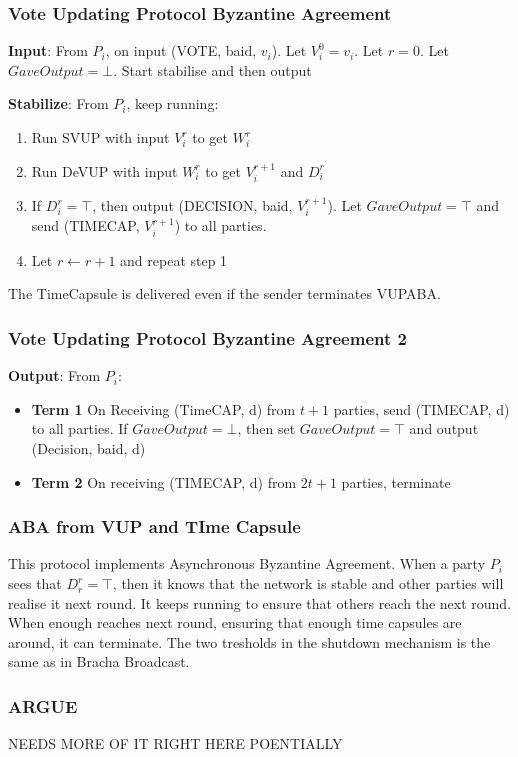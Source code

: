 \documentclass[14pt]{beamer}
\begin{document}
            \begin{frame}
                \frametitle{Vote Updating Protocol Byzantine Agreement}
                    \textbf{Input}: From $P_i$, on input (VOTE, baid, $v_i$). Let $V_{i}^0 = v_i$. Let $r = 0$. Let $GaveOutput = \bot$. Start stabilise and then output

                    \textbf{Stabilize}: From $P_i$, keep running:
                    \begin{enumerate}
                        \item Run SVUP with input $V_{i}^r$ to get $W_{i}^r$
                        \item Run DeVUP with input $W_{i}^r$ to get $V_{i}^{r+1}$ and $D_{i}^r$
                        \item If $D_{i}^r = \top$, then output (DECISION, baid, $V_{i}^{r+1}$). Let $GaveOutput = \top$ and send (TIMECAP, $V_{i}^{r+1}$) to all parties. 
                        \item Let $r \leftarrow r + 1$ and repeat step 1
                    \end{enumerate}
                    The TimeCapsule is delivered even if the sender terminates VUPABA. 
            \end{frame}
            \begin{frame}   
                \frametitle{Vote Updating Protocol Byzantine Agreement 2}
                    \textbf{Output}: From $P_i$:
                        \begin{itemize}
                            \item \textbf{Term 1} On Receiving (TimeCAP, d) from $t+1$ parties, send (TIMECAP, d) to all parties. If $GaveOutput = \bot$, then set $GaveOutput = \top$ and output (Decision, baid, d)
                            \item \textbf{Term 2} On receiving (TIMECAP, d) from $2t + 1$ parties, terminate
                        \end{itemize}
            \end{frame}

            \begin{frame}
                \frametitle{ABA from VUP and TIme Capsule}
                    This protocol implements Asynchronous Byzantine Agreement. When a party $P_i$ sees that $D_{r}^r = \top$, then it knows that the network is stable and other parties will realise it next round. It keeps running to ensure that others reach the next round. When enough reaches next round, ensuring that enough time capsules are around, it can terminate. The two tresholds in the shutdown mechanism is the same as in Bracha Broadcast. 
            \end{frame}

            \begin{frame}
                \frametitle{ARGUE }
                    NEEDS MORE OF IT RIGHT HERE POENTIALLY
                
            
            \end{frame}
\end{document}
